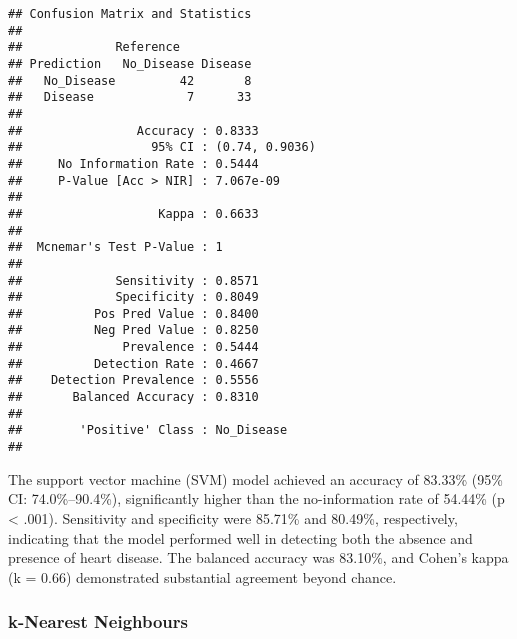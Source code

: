 \documentclass[
]{article}
\begin{document}
\begin{verbatim}
## Confusion Matrix and Statistics
## 
##             Reference
## Prediction   No_Disease Disease
##   No_Disease         42       8
##   Disease             7      33
##                                         
##                Accuracy : 0.8333        
##                  95% CI : (0.74, 0.9036)
##     No Information Rate : 0.5444        
##     P-Value [Acc > NIR] : 7.067e-09     
##                                         
##                   Kappa : 0.6633        
##                                         
##  Mcnemar's Test P-Value : 1             
##                                         
##             Sensitivity : 0.8571        
##             Specificity : 0.8049        
##          Pos Pred Value : 0.8400        
##          Neg Pred Value : 0.8250        
##              Prevalence : 0.5444        
##          Detection Rate : 0.4667        
##    Detection Prevalence : 0.5556        
##       Balanced Accuracy : 0.8310        
##                                         
##        'Positive' Class : No_Disease    
## 
\end{verbatim}

The support vector machine (SVM) model achieved an accuracy of 83.33\%
(95\% CI: 74.0\%--90.4\%), significantly higher than the no-information
rate of 54.44\% (p \textless{} .001). Sensitivity and specificity were
85.71\% and 80.49\%, respectively, indicating that the model performed
well in detecting both the absence and presence of heart disease. The
balanced accuracy was 83.10\%, and Cohen's kappa (k = 0.66) demonstrated
substantial agreement beyond chance.

\subsubsection{k-Nearest Neighbours}\label{k-nearest-neighbours}
\end{document}
